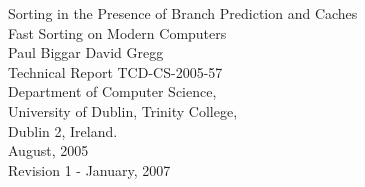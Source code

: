 \documentclass{report}
\begin{document}
\begin{titlepage}
       \begin{center}
				\vspace*{40mm}
                \Huge Sorting in the Presence of Branch Prediction and Caches\\
                \vspace{1em}
                \Large Fast Sorting on Modern Computers\\
                \vspace{2em}
                \Large Paul Biggar \hspace{1cm} David Gregg\\
				\vspace{2em}
					\large Technical Report TCD-CS-2005-57\\
					\large Department of Computer Science,\\
					\large University of Dublin, Trinity College,\\
					\large Dublin 2, Ireland.\\
				\vspace{2em}
					\large August, 2005\\
               \vspace{1em}
					\normalsize Revision 1 - January, 2007\\
        \end{center}
\end{titlepage}
\end{document}
